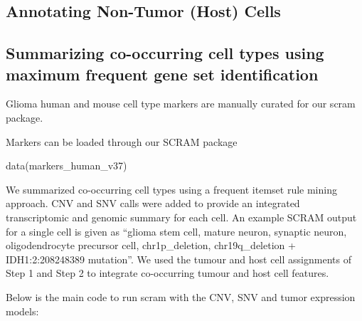 \documentclass[]{article}
\newcommand{\hlstd}[1]{\textcolor[rgb]{0.251,0.251,0.251}{#1}}%
\newenvironment{Shaded}{\begin{myshaded}}{\end{myshaded}}
\newcommand{\FunctionTok}[1]{\hlstd{#1}}
\newcommand{\NormalTok}[1]{\hlstd{#1}}
\begin{document}
\hypertarget{annotating-non-tumor-host-cells}{%
\subsection{Annotating Non-Tumor (Host) Cells}\label{annotating-non-tumor-host-cells}}

\hypertarget{summarizing-co-occurring-cell-types-using-maximum-frequent-gene-set-identification}{%
\subsection{Summarizing co-occurring cell types using maximum frequent gene set identification}\label{summarizing-co-occurring-cell-types-using-maximum-frequent-gene-set-identification}}

Glioma human and mouse cell type markers are manually curated for our scram package.

Markers can be loaded through our SCRAM package

\begin{Shaded}
\begin{Highlighting}[]

\FunctionTok{data}\NormalTok{(markers\_human\_v37)}
\end{Highlighting}
\end{Shaded}

We summarized co-occurring cell types using a frequent itemset rule mining approach. CNV and SNV calls were added to provide an integrated transcriptomic and genomic summary for each cell. An example SCRAM output for a single cell is given as ``glioma stem cell, mature neuron, synaptic neuron, oligodendrocyte precursor cell, chr1p\_deletion, chr19q\_deletion + IDH1:2:208248389 mutation''. We used the tumour and host cell assignments of Step 1 and Step 2 to integrate co-occurring tumour and host cell features.

Below is the main code to run scram with the CNV, SNV and tumor expression models:
\end{document}
